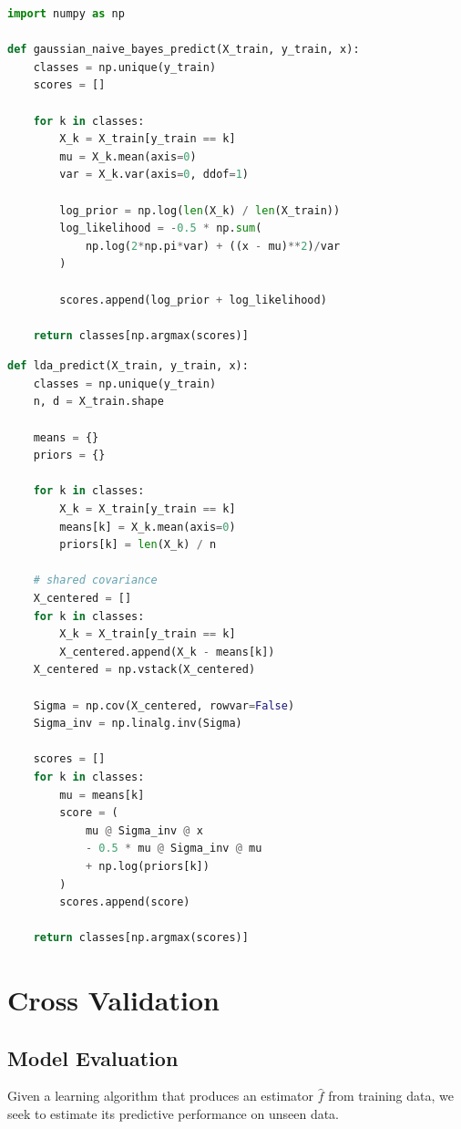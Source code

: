 \documentclass[12pt,oneside]{book}
\numberwithin{equation}{section}
\theoremstyle{definition}
\theoremstyle{plain}
\theoremstyle{remark}
\begin{document}
\begin{lstlisting}[language=Python]
import numpy as np

def gaussian_naive_bayes_predict(X_train, y_train, x):
    classes = np.unique(y_train)
    scores = []

    for k in classes:
        X_k = X_train[y_train == k]
        mu = X_k.mean(axis=0)
        var = X_k.var(axis=0, ddof=1)

        log_prior = np.log(len(X_k) / len(X_train))
        log_likelihood = -0.5 * np.sum(
            np.log(2*np.pi*var) + ((x - mu)**2)/var
        )

        scores.append(log_prior + log_likelihood)

    return classes[np.argmax(scores)]
\end{lstlisting}

\begin{lstlisting}[language=Python]
def lda_predict(X_train, y_train, x):
    classes = np.unique(y_train)
    n, d = X_train.shape

    means = {}
    priors = {}

    for k in classes:
        X_k = X_train[y_train == k]
        means[k] = X_k.mean(axis=0)
        priors[k] = len(X_k) / n

    # shared covariance
    X_centered = []
    for k in classes:
        X_k = X_train[y_train == k]
        X_centered.append(X_k - means[k])
    X_centered = np.vstack(X_centered)

    Sigma = np.cov(X_centered, rowvar=False)
    Sigma_inv = np.linalg.inv(Sigma)

    scores = []
    for k in classes:
        mu = means[k]
        score = (
            mu @ Sigma_inv @ x
            - 0.5 * mu @ Sigma_inv @ mu
            + np.log(priors[k])
        )
        scores.append(score)

    return classes[np.argmax(scores)]
\end{lstlisting}

\chapter{Cross Validation}

\section{Model Evaluation}

Given a learning algorithm that produces an estimator $\hat{f}$ from training data, we seek to estimate its predictive performance on unseen data.
\end{document}
